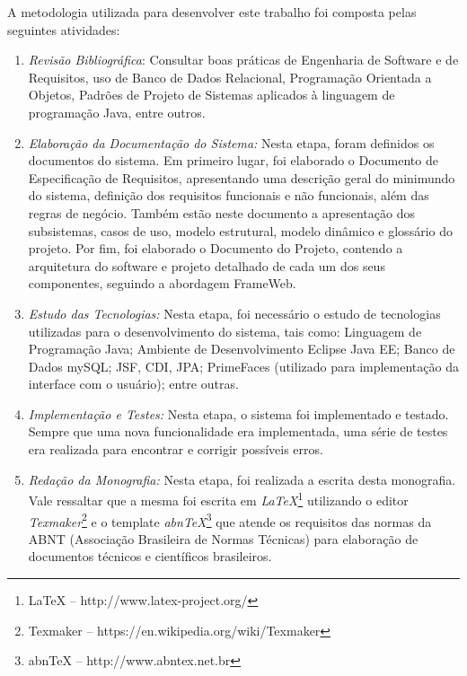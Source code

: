A metodologia utilizada para desenvolver este trabalho foi composta pelas seguintes atividades:


\begin{enumerate}
	
	\item \textit{Revisão Bibliográfica}: Consultar boas práticas de Engenharia de Software e de Requisitos, uso de Banco de Dados Relacional, Programação Orientada a Objetos, Padrões de Projeto de Sistemas aplicados à linguagem de programação Java, entre outros.
	
	\item \textit{Elaboração da Documentação do Sistema:} Nesta etapa, foram definidos os documentos do sistema. Em primeiro lugar, foi elaborado o Documento de Especificação de Requisitos, apresentando uma descrição geral do minimundo do sistema, definição dos requisitos funcionais e não funcionais, além das regras de negócio. Também estão neste documento a apresentação dos subsistemas, casos de uso, modelo estrutural, modelo dinâmico e glossário do projeto. Por fim, foi elaborado o Documento do Projeto, contendo a arquitetura do software e projeto detalhado de cada um dos seus componentes, seguindo a abordagem FrameWeb.
	
	\item \textit{Estudo das Tecnologias:} Nesta etapa, foi necessário o estudo de tecnologias utilizadas para o desenvolvimento do sistema, tais como: Linguagem de Programação Java; Ambiente de Desenvolvimento Eclipse Java EE; Banco de Dados mySQL; JSF, CDI, JPA; PrimeFaces (utilizado para implementação da interface com o usuário); entre outras.
	
	\item \textit{Implementação e Testes:} Nesta etapa, o sistema foi implementado e testado. Sempre que uma nova funcionalidade era implementada, uma série de testes era realizada para encontrar e corrigir possíveis erros.
	
	\item \textit{Redação da Monografia:}
	Nesta etapa, foi realizada a escrita desta monografia. Vale ressaltar que a mesma foi escrita em \textit{LaTeX}\footnote{LaTeX -- http://www.latex-project.org/} utilizando o editor \textit{Texmaker}\footnote{Texmaker -- https://en.wikipedia.org/wiki/Texmaker} e o template \textit{abnTeX}\footnote{abnTeX -- http://www.abntex.net.br} que atende os requisitos das normas da ABNT (Associação Brasileira de Normas Técnicas) para elaboração de documentos técnicos e científicos brasileiros.
	
\end{enumerate}


